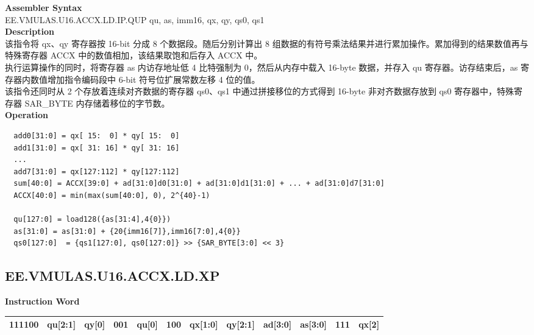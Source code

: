 \textbf{Assembler Syntax} \\
EE.VMULAS.U16.ACCX.LD.IP.QUP qu, as, imm16, qx, qy, qs0, qs1 \\
\textbf{Description} \\
该指令将 qx、qy 寄存器按 16-bit 分成 8 个数据段。随后分别计算出 8 组数据的有符号乘法结果并进行累加操作。累加得到的结果数值再与特殊寄存器 ACCX 中的数值相加，该结果取饱和后存入 ACCX 中。\\
执行运算操作的同时，将寄存器 as 内访存地址低 4 比特强制为 0，然后从内存中载入 16-byte 数据，并存入 qu 寄存器。访存结束后，as 寄存器内数值增加指令编码段中 6-bit 符号位扩展常数左移 4 位的值。\\
该指令还同时从 2 个存放着连续对齐数据的寄存器 qs0、qs1 中通过拼接移位的方式得到 16-byte 非对齐数据存放到 qs0 寄存器中，特殊寄存器 SAR\_BYTE 内存储着移位的字节数。\\
\textbf{Operation}
\begin{lstlisting}
  add0[31:0] = qx[ 15:  0] * qy[ 15:  0]
  add1[31:0] = qx[ 31: 16] * qy[ 31: 16]
  ...
  add7[31:0] = qx[127:112] * qy[127:112]
  sum[40:0] = ACCX[39:0] + ad[31:0]d0[31:0] + ad[31:0]d1[31:0] + ... + ad[31:0]d7[31:0]
  ACCX[40:0] = min(max(sum[40:0], 0), 2^{40}-1)

  qu[127:0] = load128({as[31:4],4{0}})
  as[31:0] = as[31:0] + {20{imm16[7]},imm16[7:0],4{0}}
  qs0[127:0]  = {qs1[127:0], qs0[127:0]} >> {SAR_BYTE[3:0] << 3}
\end{lstlisting}

\clearpage
\subsection{EE.VMULAS.U16.ACCX.LD.XP}\label{instruction:EEVMULASU16ACCXLDXP}
\setlength\tabcolsep{6pt}
\textbf{Instruction Word} \\
\begin{tabular}{|c|c|c|c|c|c|c|c|c|c|c|c|}
	\hline
	111100 & qu[2:1] & qy[0] & 001 & qu[0] & 100 & qx[1:0] & qy[2:1] & ad[3:0] & as[3:0] & 111 & qx[2] \\
	\hline
\end{tabular}


